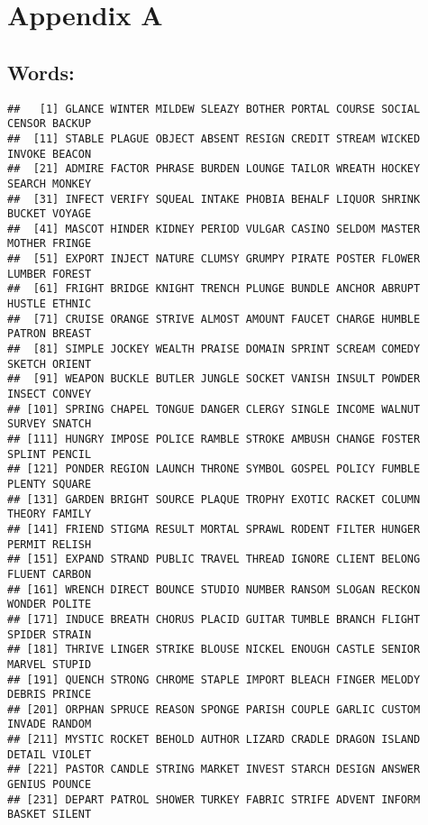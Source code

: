 \documentclass[
  english,
  man,floatsintext]{apa6}
\begin{document}
\newpage

\hypertarget{appendix-a}{%
\section{Appendix A}\label{appendix-a}}

\hypertarget{words}{%
\subsection{Words:}\label{words}}

\begin{verbatim}
##   [1] GLANCE WINTER MILDEW SLEAZY BOTHER PORTAL COURSE SOCIAL CENSOR BACKUP
##  [11] STABLE PLAGUE OBJECT ABSENT RESIGN CREDIT STREAM WICKED INVOKE BEACON
##  [21] ADMIRE FACTOR PHRASE BURDEN LOUNGE TAILOR WREATH HOCKEY SEARCH MONKEY
##  [31] INFECT VERIFY SQUEAL INTAKE PHOBIA BEHALF LIQUOR SHRINK BUCKET VOYAGE
##  [41] MASCOT HINDER KIDNEY PERIOD VULGAR CASINO SELDOM MASTER MOTHER FRINGE
##  [51] EXPORT INJECT NATURE CLUMSY GRUMPY PIRATE POSTER FLOWER LUMBER FOREST
##  [61] FRIGHT BRIDGE KNIGHT TRENCH PLUNGE BUNDLE ANCHOR ABRUPT HUSTLE ETHNIC
##  [71] CRUISE ORANGE STRIVE ALMOST AMOUNT FAUCET CHARGE HUMBLE PATRON BREAST
##  [81] SIMPLE JOCKEY WEALTH PRAISE DOMAIN SPRINT SCREAM COMEDY SKETCH ORIENT
##  [91] WEAPON BUCKLE BUTLER JUNGLE SOCKET VANISH INSULT POWDER INSECT CONVEY
## [101] SPRING CHAPEL TONGUE DANGER CLERGY SINGLE INCOME WALNUT SURVEY SNATCH
## [111] HUNGRY IMPOSE POLICE RAMBLE STROKE AMBUSH CHANGE FOSTER SPLINT PENCIL
## [121] PONDER REGION LAUNCH THRONE SYMBOL GOSPEL POLICY FUMBLE PLENTY SQUARE
## [131] GARDEN BRIGHT SOURCE PLAQUE TROPHY EXOTIC RACKET COLUMN THEORY FAMILY
## [141] FRIEND STIGMA RESULT MORTAL SPRAWL RODENT FILTER HUNGER PERMIT RELISH
## [151] EXPAND STRAND PUBLIC TRAVEL THREAD IGNORE CLIENT BELONG FLUENT CARBON
## [161] WRENCH DIRECT BOUNCE STUDIO NUMBER RANSOM SLOGAN RECKON WONDER POLITE
## [171] INDUCE BREATH CHORUS PLACID GUITAR TUMBLE BRANCH FLIGHT SPIDER STRAIN
## [181] THRIVE LINGER STRIKE BLOUSE NICKEL ENOUGH CASTLE SENIOR MARVEL STUPID
## [191] QUENCH STRONG CHROME STAPLE IMPORT BLEACH FINGER MELODY DEBRIS PRINCE
## [201] ORPHAN SPRUCE REASON SPONGE PARISH COUPLE GARLIC CUSTOM INVADE RANDOM
## [211] MYSTIC ROCKET BEHOLD AUTHOR LIZARD CRADLE DRAGON ISLAND DETAIL VIOLET
## [221] PASTOR CANDLE STRING MARKET INVEST STARCH DESIGN ANSWER GENIUS POUNCE
## [231] DEPART PATROL SHOWER TURKEY FABRIC STRIFE ADVENT INFORM BASKET SILENT
\end{verbatim}
\end{document}
